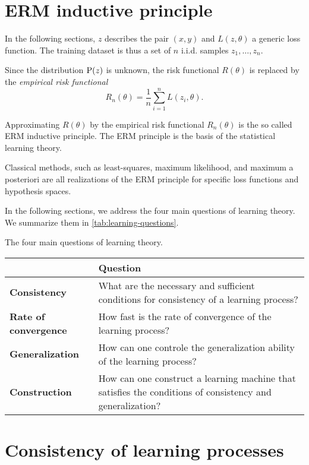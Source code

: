 \section{ERM inductive principle}

In the following sections, $z$ describes the pair $(x, y)$ and $L(z, \theta)$ a generic loss
function.  The training dataset is thus a set of $n$ i.i.d. samples $z_1, \dots, z_n$.

Since the distribution $\operatorname{P}(z)$ is unknown, the risk functional $R(\theta)$ is replaced by
the \emph{empirical risk functional}
\begin{equation}
  \label{eq:empirical-risk}
  R_n(\theta) = \frac{1}{n} \sum_{i=1}^n L(z_i, \theta)\text{.}
\end{equation}

Approximating $R(\theta)$ by the empirical risk functional $R_n(\theta)$ is the so called
ERM inductive principle.  The ERM principle is the basis of the statistical learning
theory.

Classical methods, such as least-squares, maximum likelihood, and maximum a posteriori are
all realizations of the ERM principle for specific loss functions and hypothesis spaces.

In the following sections, we address the four main questions of learning theory.  We
summarize them in \cref{tab:learning-questions}.

\begin{tablebox}[label=tab:learning-questions]{The four main questions of learning theory.}
  \begin{tabularx}{\textwidth}{@{}lX@{}}
    \toprule
     & \textbf{Question} \\
    \midrule
    \textbf{Consistency} &
      What are the necessary and sufficient conditions for consistency of a learning process? \\
    \textbf{Rate of convergence} &
      How fast is the rate of convergence of the learning process? \\
    \textbf{Generalization} &
      How can one controle the generalization ability of the learning process? \\
    \textbf{Construction} &
      How can one construct a learning machine that satisfies the conditions of consistency and generalization? \\
    \bottomrule
  \end{tabularx}
\end{tablebox}

\section{Consistency of learning processes}

